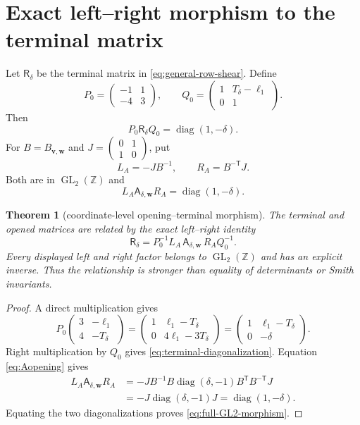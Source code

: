\documentclass[11pt]{article}
\newtheorem{theorem}{Theorem}[section]
\theoremstyle{definition}
\theoremstyle{remark}
\newcommand{\Z}{\mathbb Z}
\newcommand{\GL}{\operatorname{GL}}
\newcommand{\diag}{\operatorname{diag}}
\newcommand{\1}{\mathbf 1}
\newcommand{\mat}[4]{\begin{pmatrix}#1&#2\\#3&#4\end{pmatrix}}
\begin{document}
\section{Exact left--right morphism to the terminal matrix}

Let $\mathsf R_\delta$ be the terminal matrix in
\eqref{eq:general-row-shear}.  Define
\begin{equation}\label{eq:P0Q0}
 P_0=\mat{-1}{1}{-4}{3},
 \qquad
 Q_0=\mat{1}{T_\delta-\ell_1}{0}{1}.
\end{equation}
Then
\begin{equation}\label{eq:terminal-diagonalization}
 P_0\mathsf R_\delta Q_0=\diag(1,-\delta).
\end{equation}
For $B=B_{\mathbf v,\mathbf w}$ and
$J=\mat{0}{1}{1}{0}$, put
\begin{equation}\label{eq:LA-RA}
 L_A=-JB^{-1},\qquad R_A=B^{-\mathsf T}J.
\end{equation}
Both are in $\GL_2(\Z)$ and
\begin{equation}\label{eq:opening-diagonalization}
 L_A\mathsf A_{\delta,\mathbf w}R_A=\diag(1,-\delta).
\end{equation}

\begin{theorem}[coordinate-level opening--terminal morphism]
\label{thm:GL2-morphism}
The terminal and opened matrices are related by the exact left--right
identity
\begin{equation}\label{eq:full-GL2-morphism}
 \boxed{
 \mathsf R_\delta
 =P_0^{-1}L_A\,
  \mathsf A_{\delta,\mathbf w}\,
  R_AQ_0^{-1}.}
\end{equation}
Every displayed left and right factor belongs to $\GL_2(\Z)$ and has an
explicit inverse.  Thus the relationship is stronger than equality of
determinants or Smith invariants.
\end{theorem}

\begin{proof}
A direct multiplication gives
\[
 P_0\mat{3}{-\ell_1}{4}{-T_\delta}
 =\mat{1}{\ell_1-T_\delta}{0}{4\ell_1-3T_\delta}
 =\mat{1}{\ell_1-T_\delta}{0}{-\delta}.
\]
Right multiplication by $Q_0$ gives
\eqref{eq:terminal-diagonalization}.  Equation \eqref{eq:Aopening} gives
\begin{align*}
 L_A\mathsf A_{\delta,\mathbf w}R_A
 &=-JB^{-1}B\diag(\delta,-1)B^{\mathsf T}B^{-\mathsf T}J\\
 &=-J\diag(\delta,-1)J=\diag(1,-\delta).
\end{align*}
Equating the two diagonalizations proves \eqref{eq:full-GL2-morphism}.
\end{proof}
\end{document}
